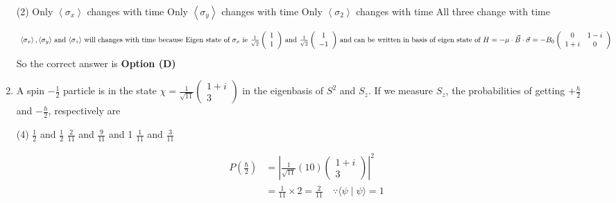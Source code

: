 \begin{enumerate}
{	}
\begin{tasks}(2)
\task[\textbf{A.}] Only $\left\langle\sigma_{x}\right\rangle$ changes with time
\task[\textbf{B.}] Only $\left\langle\sigma_{y}\right\rangle$ changes with time
\task[\textbf{C.}] Only $\left\langle\sigma_{2}\right\rangle$ changes with time
\task[\textbf{D.}] All three change with time
\end{tasks}
\begin{answer}
\begin{align*}
\intertext{ $\left\langle\sigma_{x}\right\rangle,\left\langle\sigma_{y}\right\rangle$ and $\left\langle\sigma_{z}\right\rangle$ will changes with time because Eigen state of $\sigma_{x}$ ie $\frac{1}{\sqrt{2}}\left(\begin{array}{l}1 \\ 1\end{array}\right)$ and $\frac{1}{\sqrt{2}}\left(\begin{array}{c}1 \\ -1\end{array}\right)$ and can be written in basis of eigen state of $H=-\mu \cdot \vec{B} \cdot \vec{\sigma}=-B_{0}\left(\begin{array}{cc}0 & 1-i \\ 1+i & 0\end{array}\right)$}
\end{align*}
So the correct answer is \textbf{Option (D)}
\end{answer}
	\item A spin $-\frac{1}{2}$ particle is in the state $\chi=\frac{1}{\sqrt{11}}\left(\begin{array}{c}1+i \\ 3\end{array}\right)$ in the eigenbasis of $S^{2}$ and $S_{z} .$ If we measure $S_{z}$, the probabilities of getting $+\frac{h}{2}$ and $-\frac{h}{2}$, respectively are
{	}
\begin{tasks}(4)
\task[\textbf{A.}] $\frac{1}{2}$ and $\frac{1}{2}$
\task[\textbf{B.}] $\frac{2}{11}$ and $\frac{9}{11}$
 and 1
\task[\textbf{D.}] $\frac{1}{11}$ and $\frac{3}{11}$
\end{tasks}
\begin{answer}
\begin{align*}
P\left(\frac{\hbar}{2}\right)&=\left|\frac{1}{\sqrt{11}}(10)\left(\begin{array}{c}1+i \\ 3\end{array}\right)\right|^{2}\\&=\frac{1}{11} \times 2=\frac{2}{11} \quad \because\langle\psi \mid \psi\rangle=1\\

\end{align*}
\end{answer}
\end{enumerate}
